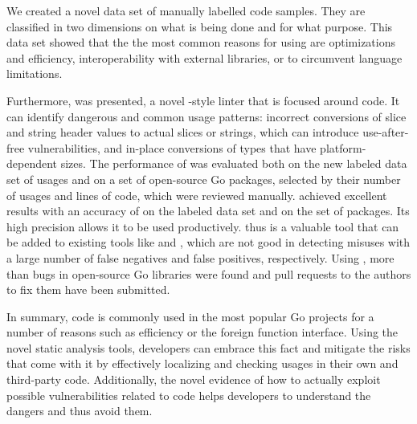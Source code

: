 We created a novel data set of \numberLabeledCodeSnippets{} manually labelled \unsafe{} code samples.
They are classified in two dimensions on what is being done and for what purpose.
This data set showed that the the most common reasons for using \unsafe{} are optimizations and efficiency,
interoperability with external libraries, or to circumvent language limitations.

Furthermore, \toolSafer{} was presented, a novel \toolVet{}-style linter that is focused around \unsafe{} code.
It can identify  dangerous and common usage patterns: incorrect conversions of slice and string header
values to actual slices or strings, which can introduce use-after-free vulnerabilities, and in-place conversions of
types that have platform-dependent sizes.
The performance of \toolSafer{} was evaluated both on the new labeled data set of \unsafe{} usages and on a set of
open-source Go packages, selected by their number of \unsafe{} usages and lines of code, which were reviewed manually.
\toolSafer{} achieved excellent results with an accuracy of \goSaferEvaluationDatasetGosaferAccuracy{} on the labeled
data set and \goSaferEvaluationPackagesGosaferAccuracy{} on the set of packages.
Its high precision allows it to be used productively.
\toolSafer{} thus is a valuable tool that can be added to existing tools like \toolVet{} and \toolGosec{}, which are
not good in detecting \unsafe{} misuses with a large number of false negatives and false positives, respectively.
Using \toolSafer{}, more than \numberBugsFixedRounded{} bugs in open-source Go libraries were found and \numberPRs{}
pull requests to the authors to fix them have been submitted.

In summary, \unsafe{} code is commonly used in the most popular Go projects for a number of reasons such as efficiency
or the foreign function interface.
Using the novel static analysis tools, developers can embrace this fact and mitigate the risks that come with it by
effectively localizing and checking \unsafe{} usages in their own and third-party code.
Additionally, the novel evidence of how to actually exploit possible vulnerabilities related to \unsafe{} code helps
developers to understand the dangers and thus avoid them.
